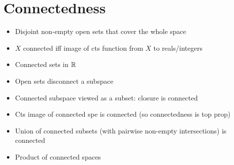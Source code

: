 \section*{Connectedness}
\begin{itemize}
    \item Disjoint non-empty open sets that cover the whole space
    \item $X$ connected iff image of cts function from $X$ to reals/integers
    \item Connected sets in $\mathbb{R}$
    \item Open sets disconnect a subspace
    \item Connected subspace viewed as a subset: closure is connected
    \item Cts image of connected spe is connected (so connectedness is top prop)
    \item Union of connected subsets (with pairwise non-empty intersections) is connected
    \item Product of connected spaces
\end{itemize}

